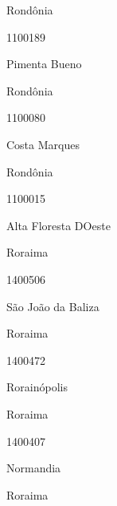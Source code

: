 \documentclass[
  letterpaper,
]{report}
\begin{document}
\n    

\n    

\n      

Rondônia

\n      

1100189

\n      

Pimenta Bueno

\n    

\n    

\n      

Rondônia

\n      

1100080

\n      

Costa Marques

\n    

\n    

\n      

Rondônia

\n      

1100015

\n      

Alta Floresta D\textquotesingle Oeste

\n    

\n    

\n      

Roraima

\n      

1400506

\n      

São João da Baliza

\n    

\n    

\n      

Roraima

\n      

1400472

\n      

Rorainópolis

\n    

\n    

\n      

Roraima

\n      

1400407

\n      

Normandia

\n    

\n    

\n      

Roraima
\end{document}
